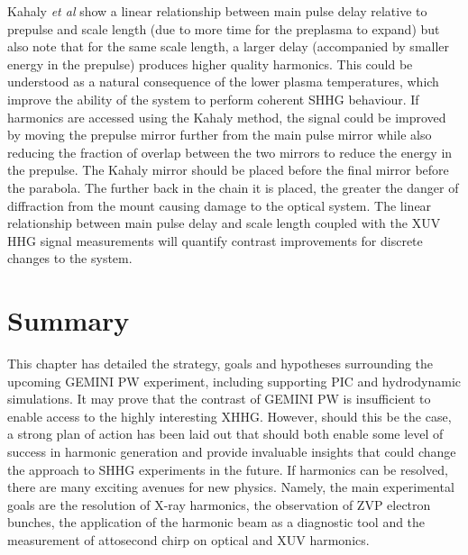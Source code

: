 Kahaly \textit{et al} show a linear relationship between main pulse delay relative to prepulse and scale length (due to more time for the preplasma to expand) but also note that for the same scale length, a larger delay (accompanied by smaller energy in the prepulse) produces higher quality harmonics. This could be understood as a natural consequence of the lower plasma temperatures, which improve the ability of the system to perform coherent SHHG behaviour. If harmonics are accessed using the Kahaly method, the signal could be improved by moving the prepulse mirror further from the main pulse mirror while also reducing the fraction of overlap between the two mirrors to reduce the energy in the prepulse. The Kahaly mirror should be placed before the final mirror before the parabola. The further back in the chain it is placed, the greater the danger of diffraction from the mount causing damage to the optical system. The linear relationship between main pulse delay and scale length coupled with the XUV HHG signal measurements will quantify contrast improvements for discrete changes to the system.

\section{Summary}
This chapter has detailed the strategy, goals and hypotheses surrounding the upcoming GEMINI PW experiment, including supporting PIC and hydrodynamic simulations. It may prove that the contrast of GEMINI PW is insufficient to enable access to the highly interesting XHHG. However, should this be the case, a strong plan of action has been laid out that should both enable some level of success in harmonic generation and provide invaluable insights that could change the approach to SHHG experiments in the future. If harmonics can be resolved, there are many exciting avenues for new physics. Namely, the main experimental goals are the resolution of X-ray harmonics, the observation of ZVP electron bunches, the application of the harmonic beam as a diagnostic tool and the measurement of attosecond chirp on optical and XUV harmonics.

